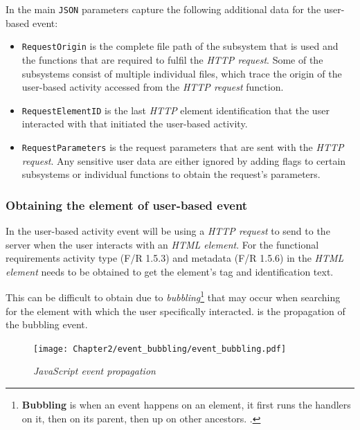 In  the main \texttt{JSON} parameters capture the following additional data for the user-based event:

\begin{itemize}
	\item \texttt{RequestOrigin} is the complete file path of the subsystem that is used and the functions that are required to fulfil the \textit{HTTP request}. Some of the subsystems consist of multiple individual files, which trace the origin of the user-based activity accessed from the \textit{HTTP request} function.
	\item \texttt{RequestElementID} is the last \textit{HTTP} element identification that the user interacted with that initiated the user-based activity.
	\item \texttt{RequestParameters} is the request parameters that are sent with the \textit{HTTP request}. Any sensitive user data are either ignored by adding flags to certain subsystems or individual functions to obtain the request's parameters.
\end{itemize}

\subsubsection{Obtaining the element of user-based event}\label{sec:ch3_ElementObtaining}
In  the user-based activity event will be using a \textit{HTTP request} to send to the server when the user interacts with an \textit{HTML element}. For the functional requirements activity type (F/R 1.5.3) and metadata (F/R 1.5.6) in  the \textit{HTML element} needs to be obtained to get the element's tag and identification text.\par This can be difficult to obtain due to \textit{bubbling}\footnote{\textbf{Bubbling} is when an event happens on an element, it first runs the handlers on it, then on its parent, then up on other ancestors. \cite{EventBubbling}.} that may occur when searching for the element with which the user specifically interacted.  is the propagation of the bubbling event.

\begin{figure}[!htb]
	\centering %
	\texttt{[image: Chapter2/event\_bubbling/event\_bubbling.pdf]}
	\caption[JavaScript event propagation]
	{\textit{JavaScript event propagation~\cite{EventBubbling}}}\label{fig:ch2_event_bubbling}
\end{figure}


